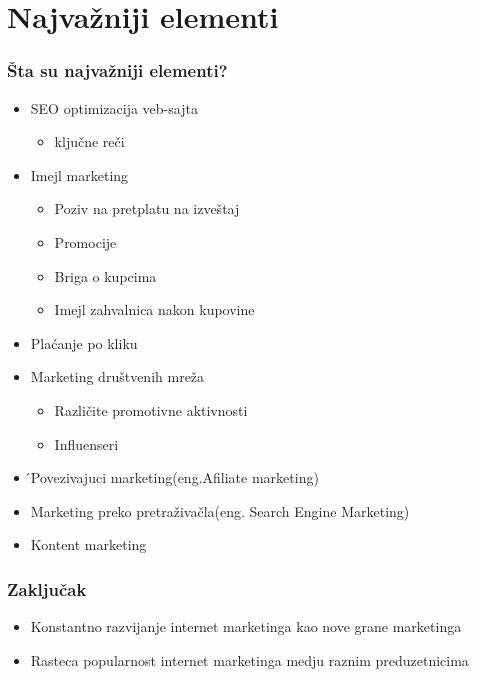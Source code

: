 \documentclass{beamer}
\begin{document}
\section{Najvažniji elementi}

\begin{frame}[fragile]\frametitle{ Šta su najvažniji elementi?}
	\begin{itemize}	
		\item SEO optimizacija veb-sajta 
		\begin{itemize}
		    \item \large  ključne reči
		\end{itemize}
			\item Imejl marketing
			\begin{itemize}
			    \item Poziv na pretplatu na izveštaj
			    \item Promocije
			    \item Briga o kupcima
			    \item Imejl zahvalnica nakon kupovine
			\end{itemize}
			\item Plaćanje po kliku
			\item Marketing društvenih mreža
			\begin{itemize}
			    \item Različite promotivne aktivnosti
			    \item Influenseri
			\end{itemize}
			\item  ́Povezivajuci marketing(eng.Afiliate marketing)
			\item Marketing preko pretraživačla(eng. Search Engine Marketing)
        		\item Kontent marketing
	\end{itemize}
\end{frame}

\begin{frame}[fragile]\frametitle{Zaključak}
	\begin{itemize}
		\item Konstantno razvijanje internet marketinga kao nove grane marketinga
        \item Rasteca popularnost internet marketinga medju raznim preduzetnicima
	\end{itemize}
\end{frame}
\end{document}
